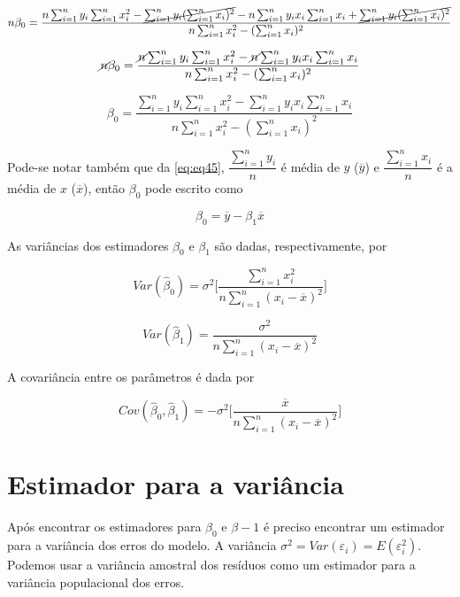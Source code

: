 $$ n\beta_0 = \dfrac{n \sum_{i=1}^{n} y_i \sum_{i=1}^{n} x_i^{2} -  \cancel{\sum_{i=1}^{n} y_i (\sum_{i=1}^{n} x_i)^2} - n \sum_{i=1}^{n} y_i x_i \sum_{i=1}^{n} x_i + \cancel{\sum_{i=1}^{n} y_i (\sum_{i=1}^{n} x_i)^2}}{n \sum_{i=1}^{n} x_i^{2} - (\sum_{i=1}^{n} x_i)^2} $$

$$ \cancel{n}\beta_0 = \dfrac{\cancel{n} \sum_{i=1}^{n} y_i \sum_{i=1}^{n} x_i^{2} - \cancel{n} \sum_{i=1}^{n} y_i x_i \sum_{i=1}^{n} x_i }{n \sum_{i=1}^{n} x_i^{2} - (\sum_{i=1}^{n} x_i)^2} $$

\begin{equation}
\label{eq:eq42}
\boxed{\beta_0 = \dfrac{ \sum_{i=1}^{n} y_i \sum_{i=1}^{n} x_i^{2} - \sum_{i=1}^{n} y_i x_i \sum_{i=1}^{n} x_i }{n \sum_{i=1}^{n} x_i^{2} - (\sum_{i=1}^{n} x_i)^2}}
\end{equation}

\noindent Pode-se notar também que da \autoref{eq:eq45}, $\dfrac{\sum_{i=1}^{n}  y_i}{n}$ é  média de $y$ ($\overline{y}$) e $\dfrac{\sum_{i=1}^{n}  x_i}{n}$ é a média de $x$ ($\overline{x}$), então $\beta_0$ pode escrito como

\begin{equation}
\label{eq:eq46}
\boxed{\beta_0 = \overline{y} - \beta_1 \overline{x}}
\end{equation}

As variâncias dos estimadores $\beta_0$ e $\beta_1$ são dadas, respectivamente, por

$$ Var(\hat{\beta}_0) = \sigma^2 \bigg[ \dfrac{\sum_{i=1}^{n} x_i^2}{n \sum_{i=1}^{n} (x_i - \overline{x})^2} \bigg]$$

$$ Var(\hat{\beta}_1) =  \dfrac{\sigma^2}{n \sum_{i=1}^{n} (x_i - \overline{x})^2}$$

A covariância entre os parâmetros é dada por

$$ Cov(\hat{\beta}_0,\hat{\beta}_1) = -\sigma^2 \bigg[ \dfrac{\overline{x}}{n \sum_{i=1}^{n} (x_i - \overline{x})^2} \bigg]$$

\section{Estimador para a variância}

\noindent Após encontrar os estimadores para $\beta_0$ e $\beta-1$ é preciso encontrar um estimador para a variância dos erros do modelo. A variância $\sigma^2 = Var(\varepsilon_i) = E(\varepsilon_i^2)$. Podemos usar a variância amostral dos resíduos como um estimador para a variância populacional dos erros.

